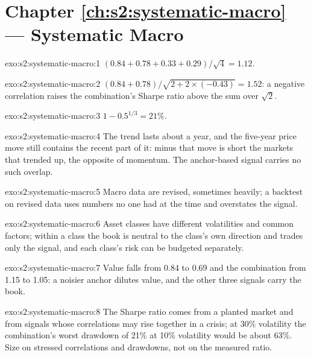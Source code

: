 \section*{Chapter \ref{ch:s2:systematic-macro} --- Systematic Macro}

\begin{solution}{exo:s2:systematic-macro:1}
$(0.84 + 0.78 + 0.33 + 0.29)/\sqrt4 = 1.12$.
\end{solution}

\begin{solution}{exo:s2:systematic-macro:2}
$(0.84 + 0.78)/\sqrt{2 + 2 \times (-0.43)} = 1.52$: a negative correlation raises the combination's Sharpe ratio above the sum over $\sqrt2$.
\end{solution}

\begin{solution}{exo:s2:systematic-macro:3}
$1 - 0.5^{1/3} = 21\%$.
\end{solution}

\begin{solution}{exo:s2:systematic-macro:4}
The trend lasts about a year, and the five-year price move still contains the recent part of it: minus that move is short the markets that trended up,
the opposite of momentum. The anchor-based signal carries no such overlap.
\end{solution}

\begin{solution}{exo:s2:systematic-macro:5}
Macro data are revised, sometimes heavily; a backtest on revised data uses numbers no one had at the time and overstates the signal.
\end{solution}

\begin{solution}{exo:s2:systematic-macro:6}
Asset classes have different volatilities and common factors; within a class the book is neutral to the class's own direction and trades only the
signal, and each class's risk can be budgeted separately.
\end{solution}

\begin{solution}{exo:s2:systematic-macro:7}
Value falls from 0.84 to 0.69 and the combination from 1.15 to 1.05: a noisier anchor dilutes value, and the other three signals carry the book.
\end{solution}

\begin{solution}{exo:s2:systematic-macro:8}
The Sharpe ratio comes from a planted market and from signals whose correlations may rise together in a crisis; at 30\% volatility the combination's
worst drawdown of 21\% at 10\% volatility would be about 63\%. Size on stressed correlations and drawdowns, not on the measured ratio.
\end{solution}

